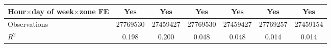 {\begin{tabular}{l*{6}{S}}
\addlinespace
Hour\(\times\)day of week\(\times\)zone FE&       {Yes}         &       {Yes}         &       {Yes}         &       {Yes}         &       {Yes}         &       {Yes}         \\
\midrule
Observations        &\num{27769530}         &\num{27459427}         &\num{27769530}         &\num{27459427}         &\num{27769257}         &\num{27459154}         \\
\(R^2\)             &     {0.198}         &     {0.200}         &     {0.048}         &     {0.048}         &     {0.014}         &     {0.014}         \\
\bottomrule
\end{tabular}
}
